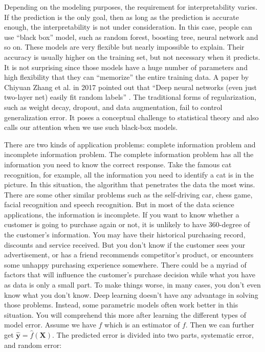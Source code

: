 \documentclass[12pt,]{krantz}
\theoremstyle{definition}
\theoremstyle{definition}
\theoremstyle{definition}
\theoremstyle{remark}
\begin{document}
Depending on the modeling purposes, the requirement for interpretability
varies. If the prediction is the only goal, then as long as the
prediction is accurate enough, the interpretability is not under
consideration. In this case, people can use ``black box'' model, such as
random forest, boosting tree, neural network and so on. These models are
very flexible but nearly impossible to explain. Their accuracy is
usually higher on the training set, but not necessary when it predicts.
It is not surprising since those models have a huge number of parameters
and high flexibility that they can ``memorize'' the entire training
data. A paper by Chiyuan Zhang et al. in 2017 pointed out that ``Deep
neural networks (even just two-layer net) easily fit random labels''
\citep{rethinkDL}. The traditional forms of regularization, such as
weight decay, dropout, and data augmentation, fail to control
generalization error. It poses a conceptual challenge to statistical
theory and also calls our attention when we use such black-box models.

There are two kinds of application problems: complete information
problem and incomplete information problem. The complete information
problem has all the information you need to know the correct response.
Take the famous cat recognition, for example, all the information you
need to identify a cat is in the picture. In this situation, the
algorithm that penetrates the data the most wins. There are some other
similar problems such as the self-driving car, chess game, facial
recognition and speech recognition. But in most of the data science
applications, the information is incomplete. If you want to know whether
a customer is going to purchase again or not, it is unlikely to have
360-degree of the customer's information. You may have their historical
purchasing record, discounts and service received. But you don't know if
the customer sees your advertisement, or has a friend recommends
competitor's product, or encounters some unhappy purchasing experience
somewhere. There could be a myriad of factors that will influence the
customer's purchase decision while what you have as data is only a small
part. To make things worse, in many cases, you don't even know what you
don't know. Deep learning doesn't have any advantage in solving those
problems. Instead, some parametric models often work better in this
situation. You will comprehend this more after learning the different
types of model error. Assume we have \(\hat{f}\) which is an estimator
of \(f\). Then we can further get
\(\mathbf{\hat{y}}=\hat{f}(\mathbf{X})\). The predicted error is divided
into two parts, systematic error, and random error:
\end{document}
